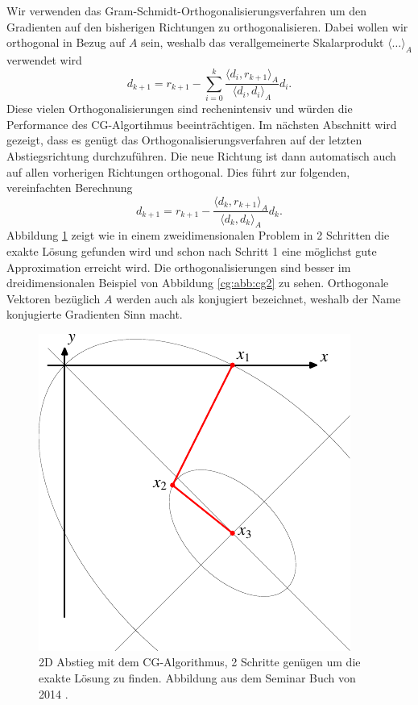 Wir verwenden das Gram-Schmidt-Orthogonalisierungsverfahren um den Gradienten auf den bisherigen Richtungen zu orthogonalisieren.
Dabei wollen wir orthogonal in Bezug auf $A$ sein, weshalb das verallgemeinerte Skalarprodukt $\langle \dots \rangle_A$ verwendet wird 
\begin{equation}\label{cg:eq:gram}
	d_{k+1} 
	= 
	r_{k+1} - \sum_{i=0}^{k} \frac{\langle d_i , r_{k+1} \rangle_A}{\langle d_i , d_i \rangle_A} d_i.
\end{equation}
Diese vielen Orthogonalisierungen sind rechenintensiv und würden die Performance des CG-Algortihmus beeinträchtigen.
Im nächsten Abschnitt wird gezeigt, dass es genügt das Orthogonalisierungsverfahren auf der letzten Abstiegsrichtung durchzuführen.
Die neue Richtung ist dann automatisch auch auf allen vorherigen Richtungen orthogonal.
Dies führt zur folgenden, vereinfachten Berechnung
\begin{equation} 
	d_{k+1}
	= 
	r_{k+1} - \frac{\langle d_k , r_{k+1} \rangle_A}{\langle d_k , d_k \rangle_A} d_k.
\end{equation}
Abbildung \ref{cg:abb:cg1} zeigt wie in einem zweidimensionalen Problem in 2 Schritten die exakte Lösung gefunden wird und schon nach Schritt 1 eine möglichst gute Approximation erreicht wird.
Die orthogonalisierungen sind besser im dreidimensionalen Beispiel von Abbildung \ref{cg:abb:cg2} zu sehen.
Orthogonale Vektoren bezüglich $A$ werden auch als konjugiert bezeichnet, weshalb der Name konjugierte Gradienten Sinn macht.
\begin{figure}	
	\centering
	\includegraphics{papers/cg/images/descent-3}
	\caption{2D Abstieg mit dem CG-Algorithmus, 2 Schritte genügen um die exakte Lösung zu finden. 
		Abbildung aus dem Seminar Buch von 2014 \cite{cg:book:hpc}.}
	\label{cg:abb:cg1}
\end{figure}

